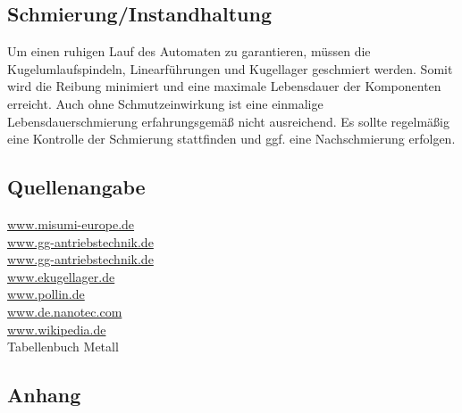 \subsection{Schmierung/Instandhaltung}

Um einen ruhigen Lauf des Automaten zu garantieren, müssen die Kugelumlaufspindeln, Linearführungen und Kugellager geschmiert werden. Somit wird die Reibung minimiert und eine maximale Lebensdauer der Komponenten erreicht. Auch ohne Schmutzeinwirkung ist eine einmalige Lebensdauerschmierung erfahrungsgemäß nicht ausreichend. Es sollte regelmäßig eine Kontrolle der Schmierung stattfinden und ggf. eine Nachschmierung erfolgen.

\subsection{Quellenangabe}

\url{www.misumi-europe.de}\\
\url{www.gg-antriebstechnik.de}\\
\url{www.gg-antriebstechnik.de}\\
\url{www.ekugellager.de}\\
\url{www.pollin.de}\\
\url{www.de.nanotec.com}\\
\url{www.wikipedia.de}\\
Tabellenbuch Metall

\newpage

\subsection{Anhang}




































